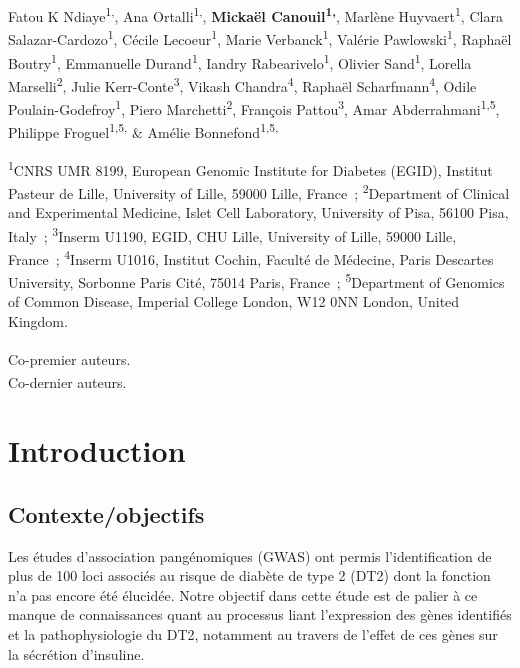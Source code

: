 \documentclass[11pt,a4paper,notrimn]{krantz}
\theoremstyle{definition}
\theoremstyle{definition}
\theoremstyle{remark}
\begin{document}
Fatou K Ndiaye\textsuperscript{1,\textasteriskcentered}, Ana
Ortalli\textsuperscript{1,\textasteriskcentered}, \textbf{Mickaël
Canouil\textsuperscript{1,\textasteriskcentered}}, Marlène
Huyvaert\textsuperscript{1}, Clara Salazar-Cardozo\textsuperscript{1},
Cécile Lecoeur\textsuperscript{1}, Marie Verbanck\textsuperscript{1},
Valérie Pawlowski\textsuperscript{1}, Raphaël Boutry\textsuperscript{1},
Emmanuelle Durand\textsuperscript{1}, Iandry
Rabearivelo\textsuperscript{1}, Olivier Sand\textsuperscript{1}, Lorella
Marselli\textsuperscript{2}, Julie Kerr-Conte\textsuperscript{3}, Vikash
Chandra\textsuperscript{4}, Raphaël Scharfmann\textsuperscript{4}, Odile
Poulain-Godefroy\textsuperscript{1}, Piero Marchetti\textsuperscript{2},
François Pattou\textsuperscript{3}, Amar
Abderrahmani\textsuperscript{1,5}, Philippe
Froguel\textsuperscript{1,5,\textdagger} \& Amélie
Bonnefond\textsuperscript{1,5,\textdagger}

\footnotesize
\textsuperscript{1}CNRS UMR 8199, European Genomic Institute for
Diabetes (EGID), Institut Pasteur de Lille, University of Lille, 59000
Lille, France~; \textsuperscript{2}Department of Clinical and
Experimental Medicine, Islet Cell Laboratory, University of Pisa, 56100
Pisa, Italy~; \textsuperscript{3}Inserm U1190, EGID, CHU Lille,
University of Lille, 59000 Lille, France~; \textsuperscript{4}Inserm
U1016, Institut Cochin, Faculté de Médecine, Paris Descartes University,
Sorbonne Paris Cité, 75014 Paris, France~; \textsuperscript{5}Department
of Genomics of Common Disease, Imperial College London, W12 0NN London,
United Kingdom.

\textsuperscript{\textasteriskcentered}Co-premier auteurs.\\
\textsuperscript{\textdagger}Co-dernier auteurs. \normalsize

\clearpage

\section{Introduction}\label{introduction-2}

\subsection{Contexte/objectifs}\label{contexteobjectifs-1}

Les études d'association pangénomiques (GWAS) ont permis
l'identification de plus de 100 loci associés au risque de diabète de
type 2 (DT2) dont la fonction n'a pas encore été élucidée. Notre
objectif dans cette étude est de palier à ce manque de connaissances
quant au processus liant l'expression des gènes identifiés et la
pathophysiologie du DT2, notamment au travers de l'effet de ces gènes
sur la sécrétion d'insuline.
\end{document}
